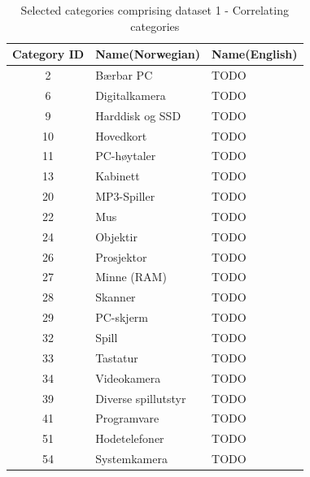 \begin{table}[h]
  \centering
  \caption{Selected categories comprising dataset 1 - Correlating categories}
  \label{table:dataset1}
  \begin{tabular}{|c|l|l|}\hline
    Category ID & Name(Norwegian)     & Name(English) \\ \hline
    2           & Bærbar PC           & TODO          \\ \hline
    6           & Digitalkamera       & TODO          \\ \hline
    9           & Harddisk og SSD     & TODO          \\ \hline
    10          & Hovedkort           & TODO          \\ \hline
    11          & PC-høytaler         & TODO          \\ \hline
    13          & Kabinett            & TODO          \\ \hline
    20          & MP3-Spiller         & TODO          \\ \hline
    22          & Mus                 & TODO          \\ \hline
    24          & Objektir            & TODO          \\ \hline
    26          & Prosjektor          & TODO          \\ \hline
    27          & Minne (RAM)         & TODO          \\ \hline
    28          & Skanner             & TODO          \\ \hline
    29          & PC-skjerm           & TODO          \\ \hline
    32          & Spill               & TODO          \\ \hline
    33          & Tastatur            & TODO          \\ \hline
    34          & Videokamera         & TODO          \\ \hline
    39          & Diverse spillutstyr & TODO          \\ \hline
    41          & Programvare         & TODO          \\ \hline
    51          & Hodetelefoner       & TODO          \\ \hline
    54          & Systemkamera        & TODO          \\ \hline
  \end{tabular}
\end{table}



